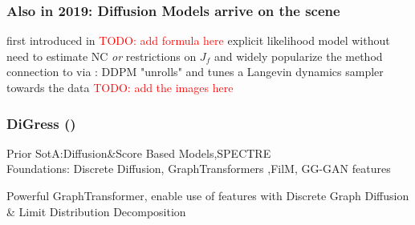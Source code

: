 \documentclass[./presentation.tex]{subfiles}
\begin{document}
\begin{frame}[label=working]
  \frametitle{Also in 2019: Diffusion Models arrive on the scene}
  first introduced in \cite{sohl-dicksteinDeepUnsupervisedLearning2015b}
  \textcolor{red}{TODO: add formula here}
  explicit likelihood model without need to estimate NC \emph{or} restrictions on $J_f$
  \cite{hoDenoisingDiffusionProbabilistic2020f}and \cite{songMaximumLikelihoodTraining2021a} widely popularize the method
  connection to \cite{niuPermutationInvariantGraph2020b} via \cite{songGenerativeModelingEstimating2019b}: DDPM \citep{hoDenoisingDiffusionProbabilistic2020f} "unrolls" and tunes a Langevin dynamics sampler towards the data
  \textcolor{red}{TODO: add the images here}
\end{frame}
\begin{frame}[t]
  \frametitle{DiGress (\cite{vignacDiGressDiscreteDenoising2023b})}
  \vspace{-1cm}
  \begin{priorart}
    Prior SotA:Diffusion\&Score Based Models\cite{niuPermutationInvariantGraph2020b,songGenerativeModelingEstimating2019b},SPECTRE\cite{martinkusSPECTRESpectralConditioning2022b}\\
   Foundations: Discrete Diffusion\cite{austinStructuredDenoisingDiffusion2021e}, GraphTransformers \cite{vaswaniAttentionAllYou2017c},FilM, GG-GAN features \cite{krawczukGGGANGeometricGraph2020}
  \end{priorart}
  \begin{contributions}
    Powerful GraphTransformer, enable use of features with Discrete Graph Diffusion \& Limit Distribution Decomposition 
  \end{contributions}
  \begin{columns}
        \tiny
    \begin{column}{0.5\textwidth}
    \end{column}
    \begin{column}{0.5\textwidth}
    \end{column}
  \end{columns}
    \vspace{1cm}
  
\end{frame}
\end{document}
